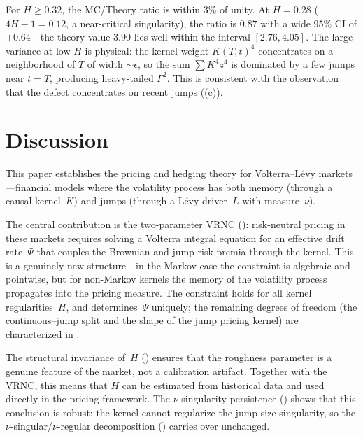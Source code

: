 \documentclass[11pt,a4paper]{article}
\theoremstyle{plain}
\theoremstyle{definition}
\theoremstyle{remark}
\begin{document}
For $H \geq 0.32$, the MC/Theory ratio is within $3\%$ of
unity.  At $H = 0.28$ ($4H - 1 = 0.12$, a near-critical
singularity), the ratio is $0.87$ with a wide 95\% CI of
$\pm 0.64$---the theory value $3.90$ lies well within the
interval $[2.76, 4.05]$.  The large variance at low $H$ is
physical: the kernel weight $K(T,t)^4$ concentrates on a
neighborhood of $T$ of width $\sim \epsilon$, so the sum
$\sum K^4 z^4$ is dominated by a few jumps near $t = T$,
producing heavy-tailed $\Gamma^2$.  This is consistent with
the observation that the defect concentrates on recent jumps
((c)).






\section{Discussion}\label{sec:discussion}

This paper establishes the pricing and hedging theory for
Volterra--L\'evy markets---financial models where the volatility
process has both memory (through a causal kernel~$K$) and jumps
(through a L\'evy driver~$L$ with measure~$\nu$).

The central contribution is the two-parameter VRNC
(): risk-neutral pricing in these
markets requires solving a Volterra integral equation for
an effective drift rate~$\Psi$ that couples the Brownian and
jump risk premia through the kernel.  This is a genuinely new
structure---in the Markov case the constraint is algebraic and
pointwise, but for non-Markov kernels the memory of the
volatility process propagates into the pricing measure.
The constraint holds for all kernel regularities~$H$, and
determines~$\Psi$ uniquely; the remaining degrees of freedom
(the continuous--jump split and the shape of the jump pricing
kernel) are characterized in .

The structural invariance of~$H$ ()
ensures that the roughness parameter is a genuine feature of
the market, not a calibration artifact.  Together with the VRNC,
this means that $H$ can be estimated from historical data and
used directly in the pricing framework.  The
$\nu$-singularity persistence ()
shows that this conclusion is robust: the kernel cannot
regularize the jump-size singularity, so the
$\nu$-singular/$\nu$-regular decomposition
() carries over unchanged.
\end{document}
